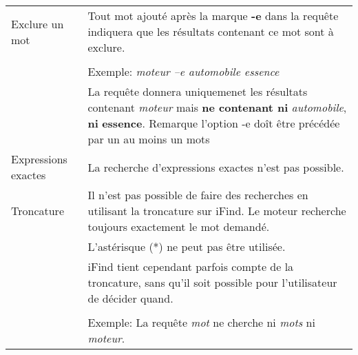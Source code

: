 \begin{longtable}{| p{3.5cm} | p{9cm} |}
\hline
Exclure un mot & Tout mot ajouté après la marque \textbf{-e} dans la requête 
indiquera que les résultats contenant ce mot sont à exclure.\\
& \\
& Exemple: \textit{moteur –e automobile essence}\\
& La requête donnera uniquemenet les résultats contenant \textit{moteur} mais 
\textbf{ne contenant ni} \textit{automobile}, \textbf{ni} \textbf{essence}. Remarque l'option -e doît être précédée par un au moins un mots\\

\hline
Expressions exactes & La recherche d'expressions exactes n'est pas possible.\\

\hline
Troncature & Il n'est pas possible de faire des recherches en utilisant la
troncature sur iFind. Le moteur recherche toujours exactement le mot demandé.\\
& L'astérisque (*) ne peut pas être utilisée.\\
& iFind tient cependant parfois compte de la troncature, sans qu'il soit possible
pour l'utilisateur de décider quand.\\
&\\
& Exemple: La requête \textit{mot} ne cherche ni \textit{mots} ni \textit{moteur}.\\
\hline
\end{longtable}
